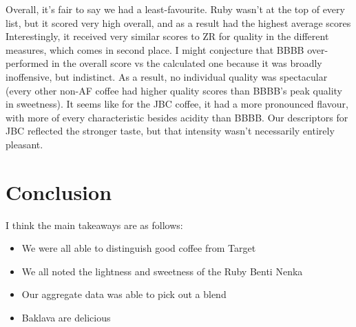 \documentclass[12pt]{article}
\begin{document}
Overall, it's fair to say we had a least-favourite.
Ruby wasn't at the top of every list, but it scored very high overall, and as a result had the highest average scores
Interestingly, it received very similar scores to ZR for quality in the different measures,  which comes in second place.
I might conjecture that BBBB over-performed in the overall score vs the calculated one because it was broadly inoffensive, but indistinct.
As a result, no individual quality was spectacular (every other non-AF coffee had higher quality scores than BBBB's peak quality in sweetness).
It seems like for the JBC coffee, it had a more pronounced flavour, with more of every characteristic besides acidity than BBBB.
Our descriptors for JBC reflected the stronger taste, but that intensity wasn't necessarily entirely pleasant.

\section{Conclusion} \label{sec:Conclusions}
I think the main takeaways are as follows:
\begin{itemize}
	\item We were all able to distinguish good coffee from Target
	\item We all noted the lightness and sweetness of the Ruby Benti Nenka
	\item Our aggregate data was able to pick out a blend
	\item Baklava are delicious
\end{itemize}

\appendix
\end{document}
